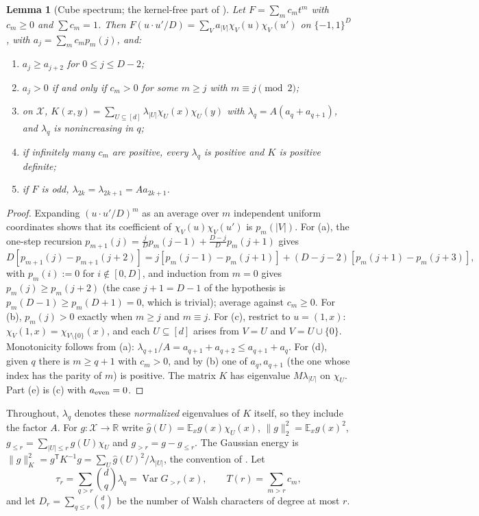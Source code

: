 \documentclass[11pt]{article}
\newtheorem{lemma}[theorem]{Lemma}
\theoremstyle{definition}\newtheorem{assumption}[theorem]{Assumption}
\theoremstyle{remark}\newtheorem{remark}[theorem]{Remark}
\DeclareMathOperator{\Var}{Var}
\newcommand{\E}{\mathbb E}
\newcommand{\X}{\mathcal X}
\newcommand{\R}{\mathbb R}
\begin{document}
\begin{lemma}[Cube spectrum; the kernel-free part of {\cite[Lemma~3.1]{subcritical}}]
\label{lem:spectrum}
Let $F=\sum_mc_mt^m$ with $c_m\ge0$ and $\sum c_m=1$. Then
$F(u\cdot u'/D)=\sum_Va_{|V|}\chi_V(u)\chi_V(u')$ on $\{-1,1\}^D$, with
$a_j=\sum_mc_mp_m(j)$, and:
\begin{enumerate}
\item[(a)] $a_j\ge a_{j+2}$ for $0\le j\le D-2$;
\item[(b)] $a_j>0$ if and only if $c_m>0$ for some $m\ge j$ with
$m\equiv j\pmod 2$;
\item[(c)] on $\X$, $K(x,y)=\sum_{U\subseteq[d]}\lambda_{|U|}\chi_U(x)
\chi_U(y)$ with $\lambda_q=A(a_q+a_{q+1})$, and
$\lambda_q$ is nonincreasing in $q$;
\item[(d)] if infinitely many $c_m$ are positive, every $\lambda_q$ is
positive and $K$ is positive definite;
\item[(e)] if $F$ is odd, $\lambda_{2k}=\lambda_{2k+1}=Aa_{2k+1}$.
\end{enumerate}
\end{lemma}
\begin{proof}
Expanding $(u\cdot u'/D)^m$ as an average over $m$ independent uniform
coordinates shows that its coefficient of $\chi_V(u)\chi_V(u')$ is
$p_m(|V|)$. For (a), the one-step recursion
$p_{m+1}(j)=\frac jDp_m(j-1)+\frac{D-j}Dp_m(j+1)$ gives
\[
 D[p_{m+1}(j)-p_{m+1}(j+2)]
 =j[p_m(j-1)-p_m(j+1)]+(D-j-2)[p_m(j+1)-p_m(j+3)],
\]
with $p_m(i):=0$ for $i\notin[0,D]$, and induction from $m=0$ gives
$p_m(j)\ge p_m(j+2)$ (the case $j+1=D-1$ of the hypothesis is
$p_m(D-1)\ge p_m(D+1)=0$, which is trivial); average against $c_m\ge0$. For (b),
$p_m(j)>0$ exactly when $m\ge j$ and $m\equiv j$. For (c), restrict to
$u=(1,x)$: $\chi_V(1,x)=\chi_{V\setminus\{0\}}(x)$, and each $U\subseteq[d]$
arises from $V=U$ and $V=U\cup\{0\}$. Monotonicity follows from (a):
$\lambda_{q+1}/A=a_{q+1}+a_{q+2}\le a_{q+1}+a_q$. For (d), given $q$ there
is $m\ge q+1$ with $c_m>0$, and by (b) one of $a_q,a_{q+1}$ (the one whose
index has the parity of $m$) is positive. The matrix $K$ has eigenvalue
$M\lambda_{|U|}$ on $\chi_U$. Part (e) is (c) with $a_{\rm even}=0$.
\end{proof}

Throughout, $\lambda_q$ denotes these \emph{normalized} eigenvalues of $K$
itself, so they include the factor $A$. For $g:\X\to\R$ write
$\widehat g(U)=\E_xg(x)\chi_U(x)$, $\|g\|_2^2=\E_xg(x)^2$,
$g_{\le r}=\sum_{|U|\le r}\widehat g(U)\chi_U$ and $g_{>r}=g-g_{\le r}$.
The Gaussian energy is $\|g\|_K^2=g^{\mathsf T}K^{-1}g=\sum_U\widehat g(U)^2/
\lambda_{|U|}$, the convention of \cite{subcritical}. Let
\[
 \tau_r=\sum_{q>r}\binom dq\lambda_q=\Var G_{>r}(x),\qquad
 T(r)=\sum_{m>r}c_m ,
\]
and let $D_r=\sum_{q\le r}\binom dq$ be the number of Walsh characters of
degree at most $r$.
\end{document}
